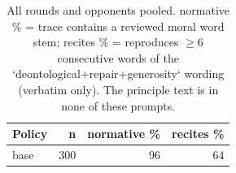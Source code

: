 \begin{table}[t]
\centering
\caption{All rounds and opponents pooled. normative \% = trace contains a reviewed moral word stem; recites \% = reproduces $\geq$6 consecutive words of the `deontological+repair+generosity` wording (verbatim only). The principle text is in none of these prompts.}
\label{tab:mr-traces}
\small
\setlength{\tabcolsep}{3.5pt}
\begin{tabular}{lrrr}
\toprule
Policy & n & normative \% & recites \% \\
\midrule
base & 300 & 96 & 64 \\
\bottomrule
\end{tabular}
\end{table}
